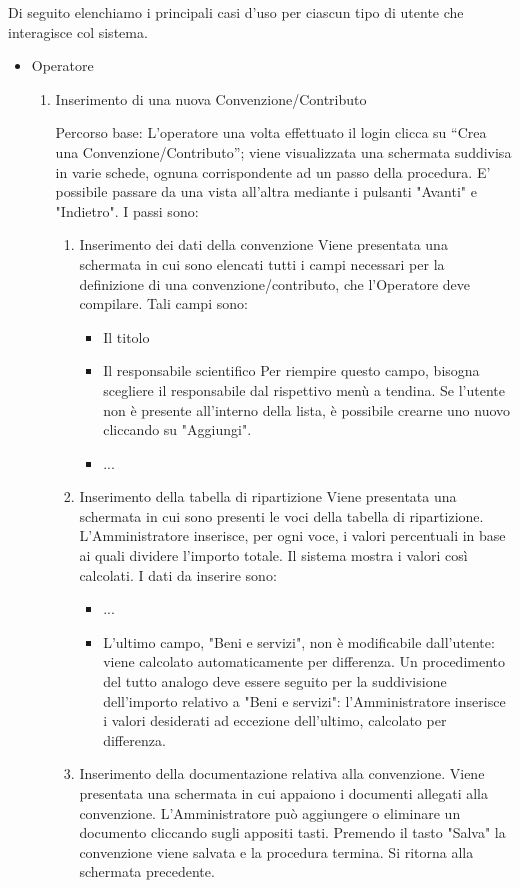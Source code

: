 Di seguito elenchiamo i principali casi d'uso per ciascun tipo di utente che interagisce col sistema.

\begin{itemize}
 \item Operatore
    \begin{enumerate}
     \item Inserimento di una nuova Convenzione/Contributo\newline
     
     Percorso base:
	L'operatore una volta effettuato il login clicca su ``Crea una Convenzione/Contributo''; viene visualizzata una schermata suddivisa in varie schede, ognuna corrispondente ad un passo della procedura. E' possibile passare da una
	vista all'altra mediante i pulsanti "Avanti" e "Indietro". I passi sono:
	\begin{enumerate}
	 \item Inserimento dei dati della convenzione\newline
	    Viene presentata una schermata in cui sono elencati tutti i campi necessari per la definizione di una convenzione/contributo, 
	    che l'Operatore deve compilare. Tali campi sono:
	    \begin{itemize}
	     \item Il titolo
	     \item Il responsabile scientifico\newline 
		Per riempire questo campo, bisogna scegliere il responsabile dal rispettivo menù a tendina. 
		Se l'utente non è presente all'interno della lista, è possibile crearne uno nuovo cliccando su "Aggiungi".
	     \item ...
	    \end{itemize}
	    
	 \item Inserimento della tabella di ripartizione\newline
	    Viene presentata una schermata in cui sono presenti le voci della tabella di ripartizione. L'Amministratore inserisce, per ogni voce, i valori percentuali 
			in base ai quali dividere l'importo totale. Il sistema mostra i valori così calcolati. I dati
			da inserire sono:
	    \begin{itemize}
	     \item ...
	     \item L'ultimo campo, "Beni e servizi", non è modificabile dall'utente: viene calcolato automaticamente per differenza.
		Un procedimento del tutto analogo deve essere seguito per la suddivisione dell'importo relativo a "Beni e servizi": l'Amministratore inserisce i valori desiderati
		ad eccezione dell'ultimo, calcolato per differenza.
	    \end{itemize}
	 \item Inserimento della documentazione relativa alla convenzione.
		Viene presentata una schermata in cui appaiono i documenti allegati alla convenzione. L'Amministratore può aggiungere o eliminare un documento 
		cliccando sugli appositi tasti. Premendo il tasto "Salva" la convenzione viene salvata e la procedura termina. Si ritorna alla schermata precedente.
	\end{enumerate}
		 

\end{enumerate}
\end{itemize}

